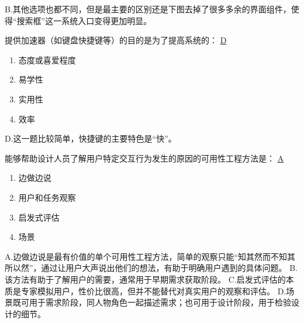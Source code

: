\begin{solution}
B.其他选项也都不同，但是最主要的区别还是下图去掉了很多多余的界面组件，使得“搜索框”这一系统入口变得更加明显。
\end{solution}


\begin{problem}
	提供加速器（如键盘快捷键等）的目的是为了提高系统的：
	\uline{D}    
    \vspace{-0.8em}
    \begin{multicols}{4}
        \begin{enumerate}[label=\Alph*.]
            \item 态度或喜爱程度
            \item 易学性
            \item 实用性
            \item 效率
        \end{enumerate}
    \end{multicols}
    \vspace{-1em}
\end{problem}

\begin{solution}
D.这一题比较简单，快捷键的主要特色是“快”。
\end{solution}


\begin{problem}
	能够帮助设计人员了解用户特定交互行为发生的原因的可用性工程方法是：
	\uline{A}    
    \vspace{-0.8em}
    \begin{multicols}{4}
        \begin{enumerate}[label=\Alph*.]
            \item 边做边说
            \item 用户和任务观察
            \item 启发式评估
            \item 场景
        \end{enumerate}
    \end{multicols}
    \vspace{-1em}
\end{problem}

\begin{solution}
A.边做边说是最有价值的单个可用性工程方法，简单的观察只能“知其然而不知其所以然”，通过让用户大声说出他们的想法，有助于明确用户遇到的具体问题。  B.该方法有助于了解用户的需要，通常用于早期需求获取阶段。  C.启发式评估的本质是专家模拟用户，性价比很高，但并不能替代对真实用户的观察和评估。  D.场景既可用于需求阶段，同人物角色一起描述需求；也可用于设计阶段，用于检验设计的细节。
\end{solution}